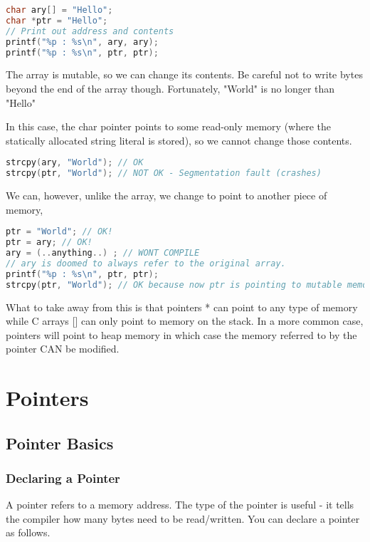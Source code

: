 \begin{lstlisting}[language=C]
char ary[] = "Hello";
char *ptr = "Hello";
// Print out address and contents
printf("%p : %s\n", ary, ary);
printf("%p : %s\n", ptr, ptr);
\end{lstlisting}

The array is mutable, so we can change its contents. Be careful not to write bytes beyond the end of the array though. Fortunately, "World" is no longer than "Hello"

In this case, the char pointer  points to some read-only memory (where the statically allocated string literal is stored), so we cannot change those contents.

\begin{lstlisting}[language=C]
strcpy(ary, "World"); // OK
strcpy(ptr, "World"); // NOT OK - Segmentation fault (crashes)
\end{lstlisting}

We can, however, unlike the array, we change  to point to
another piece of memory,

\begin{lstlisting}[language=C]
ptr = "World"; // OK!
ptr = ary; // OK!
ary = (..anything..) ; // WONT COMPILE
// ary is doomed to always refer to the original array.
printf("%p : %s\n", ptr, ptr);
strcpy(ptr, "World"); // OK because now ptr is pointing to mutable memory (the array)
\end{lstlisting}

What to take away from this is that pointers * can point to any type of memory while C arrays {[}{]} can only point to memory on the stack. In a more common case, pointers will point to heap memory in which case the memory referred to by the pointer CAN be modified.


\section{Pointers}

\subsection{Pointer Basics}

\subsubsection{Declaring a Pointer}

A pointer refers to a memory address. The type of the pointer is useful
- it tells the compiler how many bytes need to be read/written. You can
declare a pointer as follows.

